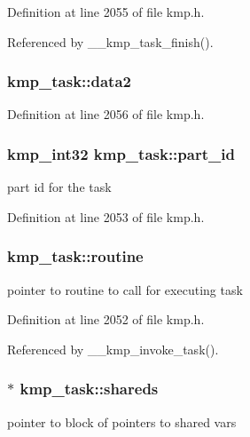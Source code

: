 Definition at line 2055 of file kmp.\-h.



Referenced by \-\_\-\-\_\-kmp\-\_\-task\-\_\-finish().

\hypertarget{structkmp__task_a53b9731aa85d94f416024ccdaae48b31}{
\subsubsection[{data2}]{ kmp\-\_\-task\-::data2}}\label{structkmp__task_a53b9731aa85d94f416024ccdaae48b31}


Definition at line 2056 of file kmp.\-h.

\hypertarget{structkmp__task_a295f4c11c7a6e1429b923b1943891dd3}{
\subsubsection[{part\-\_\-id}]{\setlength{\rightskip}{0pt plus 5cm}kmp\-\_\-int32 kmp\-\_\-task\-::part\-\_\-id}}\label{structkmp__task_a295f4c11c7a6e1429b923b1943891dd3}
part id for the task 

Definition at line 2053 of file kmp.\-h.

\hypertarget{structkmp__task_ac00e18629b8e1b48d156efc2a420a129}{
\subsubsection[{routine}]{ kmp\-\_\-task\-::routine}}\label{structkmp__task_ac00e18629b8e1b48d156efc2a420a129}
pointer to routine to call for executing task 

Definition at line 2052 of file kmp.\-h.



Referenced by \-\_\-\-\_\-kmp\-\_\-invoke\-\_\-task().

\hypertarget{structkmp__task_ad0e726e6cc9b1f0200ef55def8edb2da}{
\subsubsection[{shareds}]{$\ast$ kmp\-\_\-task\-::shareds}}\label{structkmp__task_ad0e726e6cc9b1f0200ef55def8edb2da}
pointer to block of pointers to shared vars 

